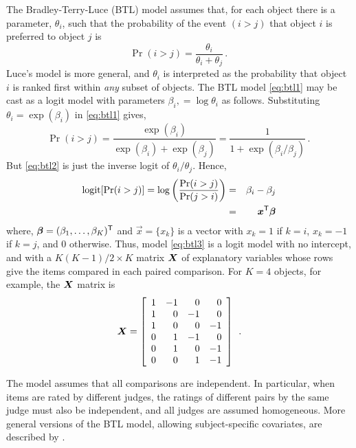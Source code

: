 The Bradley-Terry-Luce (BTL) model assumes that, for each object there is
a parameter, $\theta_i$, such that the probability of the event $(i > j)$
that object $i$
is preferred to object $j$ is
\begin{equation}\label{eq:btl1}
\Pr ( i > j ) = \frac{\theta_i}{\theta_i + \theta_j}
\period
\end{equation}
Luce's model is more general, and $\theta_i$ is interpreted as
the probability that object $i$ is ranked first within \emph{any} subset
of objects.
The BTL model \eqref{eq:btl1} may be cast as a logit model with parameters
$\beta_i,= \log \theta_i$ as follows.
Substituting $\theta_i = \exp (\beta_i)$ in \eqref{eq:btl1} gives,
\begin{equation}\label{eq:btl2}
\Pr ( i > j ) = \frac{\exp(\beta_i)}{\exp(\beta_i) + \exp(\beta_j)}
     = \frac{1}{1 + \exp(\beta_i / \beta_j)}
	  \period
\end{equation}
But \eqref{eq:btl2} is just the inverse logit of $\theta_i/\theta_j$. Hence,
\begin{eqnarray}
\logit [ \Pr (i>j)] = \log \left( \frac{\Pr (i>j)}{\Pr (j>i)} \right)
    & = & \beta_i - \beta_j  \label{eq:btl3} \\
    & = & \vec{x}\trans \vec{\beta} \nonumber
\end{eqnarray}
where, $\bm{\beta} = ( \beta_1, \dots , \beta_K)^\mathsf{T}$ and
$\vec{x} = \{x_k\}$ is a vector with
$x_k = 1$ if $k=i$, $x_k = -1$ if $k=j$, and 0 otherwise.
Thus, model \eqref{eq:btl3} is a logit model with no intercept,
and with a $K (K-1)/2 \times K$ matrix $\bm{X}$ of explanatory
variables whose rows give the items compared in each
paired comparison.  For $K=4$ objects, for example, the $\bm{X}$ matrix is
\begin{equation*}
 \bm{X} = \left[
  \begin{array}{rrrr}
  1 & -1 & 0 & 0 \\
  1 & 0 & -1 & 0 \\
  1 & 0 & 0 & -1 \\
  0 & 1 & -1 & 0 \\
  0 & 1 & 0 & -1 \\
  0 & 0 & 1 & -1 \\
  \end{array}
 \right]
 \:\: .
\end{equation*}

The model assumes that all comparisons are independent.  In particular,
when items are rated by different judges,  the ratings of different
pairs by the same judge must also be independent, and all judges are
assumed homogeneous.
More general versions of the BTL model, allowing subject-specific
covariates, are described by \citet{Dittrich-etal:1998}.

